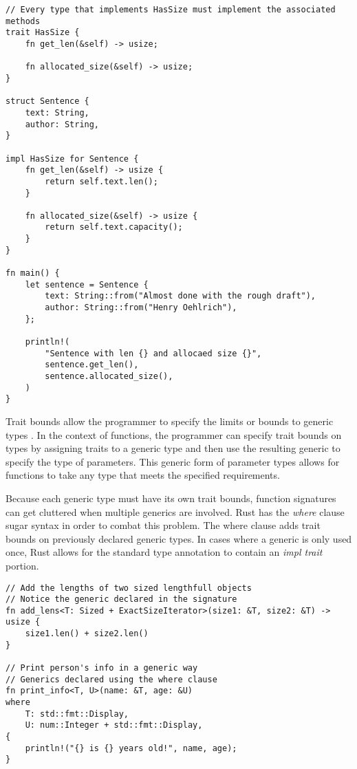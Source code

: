 \documentclass[12pt]{article}
\begin{document}
\singlespacing{}
\begin{verbatim}
// Every type that implements HasSize must implement the associated methods
trait HasSize {
    fn get_len(&self) -> usize;

    fn allocated_size(&self) -> usize;
}

struct Sentence {
    text: String,
    author: String,
}

impl HasSize for Sentence {
    fn get_len(&self) -> usize {
        return self.text.len();
    }

    fn allocated_size(&self) -> usize {
        return self.text.capacity();
    }
}

fn main() {
    let sentence = Sentence {
        text: String::from("Almost done with the rough draft"),
        author: String::from("Henry Oehlrich"),
    };

    println!(
        "Sentence with len {} and allocaed size {}",
        sentence.get_len(),
        sentence.allocated_size(),
    )
}
\end{verbatim}
\doublespacing{}

Trait bounds allow the programmer to specify the limits or bounds to generic
types \cite{rustforrustaceans}. In the context of functions, the programmer can
specify trait bounds on types by assigning traits to a generic type and then
use the resulting generic to specify the type of parameters. This generic form
of parameter types allows for functions to take any type that meets the
specified requirements.

Because each generic type must have its own trait bounds, function signatures
can get cluttered when multiple generics are involved. Rust has the
\textit{where} clause sugar syntax in order to combat this problem. The where
clause adds trait bounds on previously declared generic types. In cases where a
generic is only used once, Rust allows for the standard type annotation to
contain an \textit{impl trait} portion.

\singlespacing{}
\begin{verbatim}
// Add the lengths of two sized lengthfull objects
// Notice the generic declared in the signature
fn add_lens<T: Sized + ExactSizeIterator>(size1: &T, size2: &T) -> usize {
    size1.len() + size2.len()
}

// Print person's info in a generic way
// Generics declared using the where clause
fn print_info<T, U>(name: &T, age: &U)
where
    T: std::fmt::Display,
    U: num::Integer + std::fmt::Display,
{
    println!("{} is {} years old!", name, age);
}
\end{verbatim}
\doublespacing{}
\end{document}
